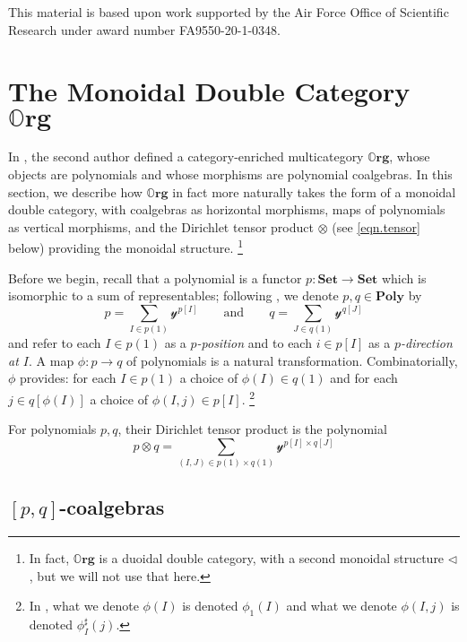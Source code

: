\documentclass{eptcs}
\theoremstyle{definition}
\theoremstyle{plain}
\newcommand{\Cat}[1]{\textbf{#1}}%
\newcommand{\smset}{\Cat{Set}}
\newcommand{\yon}{\mathcal{y}}
\newcommand{\poly}{\Cat{Poly}}
\newcommand{\0}{\textsf{0}}
\newcommand{\1}{\tn{\textsf{1}}}
\newcommand{\tri}{\mathbin{\triangleleft}}
\newcommand{\qqand}{\qquad\text{and}\qquad}
\newcommand{\org}{{\mathbb{O}\Cat{rg}}}
\begin{document}
This material is based upon work supported by the Air Force Office of Scientific Research under award number FA9550-20-1-0348.


\section{The Monoidal Double Category $\org$}\label{chap.org}

In \cite{spivak2021learners}, the second author defined a category-enriched multicategory $\org$, whose objects are polynomials and whose morphisms are polynomial coalgebras. In this section, we describe how $\org$ in fact more naturally takes the form of a monoidal double category, with coalgebras as horizontal morphisms, maps of polynomials as vertical morphisms, and the Dirichlet tensor product $\otimes$ (see \eqref{eqn.tensor} below) providing the monoidal structure.%
\footnote{In fact, $\org$ is a duoidal double category, with a second monoidal structure $\tri$, but we will not use that here.}

Before we begin, recall that a polynomial is a functor $p\colon \smset\to\smset$ which is isomorphic to a sum of representables; following \cite{spivak2021learners}, we denote $p,q\in\poly$ by
\begin{equation}\label{eqn.poly_notation}
p = \sum_{I \in p(1)} \yon^{p[I]} \qqand q = \sum_{J \in q(1)} \yon^{q[J]}
\end{equation}
and refer to each $I\in p(1)$ as a \emph{$p$-position} and to each $i\in p[I]$ as a \emph{$p$-direction at $I$}. A map $\phi\colon p\to q$ of polynomials is a natural transformation. Combinatorially, $\phi$ provides: for each $I\in p(1)$ a choice of $\phi(I)\in q(1)$ and for each $j\in q[\phi(I)]$ a choice of $\phi(I,j)\in p[I]$.%
\footnote{In \cite{spivak2021learners}, what we denote $\phi(I)$ is denoted $\phi_1(I)$ and what we denote $\phi(I,j)$ is denoted $\phi^\sharp_I(j)$.}

For polynomials $p,q$, their Dirichlet tensor product is the polynomial
\begin{equation}\label{eqn.tensor}
p \otimes q = \sum_{(I,J) \in p(1) \times q(1)} \yon^{p[I] \times q[J]}
\end{equation}


\subsection{$[p,q]$-coalgebras}
\end{document}
